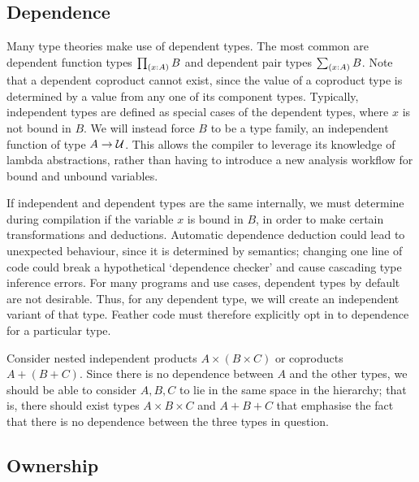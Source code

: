 \documentclass[UKenglish, 11pt, a4paper, parskip=half]{scrbook}
\begin{document}
\subsection{Dependence}

Many type theories make use of dependent types.
The most common are dependent function types \( \tprd{x:A} B \) and dependent pair types \( \tsm{x:A} B \).
Note that a dependent coproduct cannot exist, since the value of a coproduct type is determined by a value from any one of its component types.
Typically, independent types are defined as special cases of the dependent types, where \( x \) is not bound in \( B \).
We will instead force \( B \) to be a type family, an independent function of type \( A \to \mathcal{U} \).
This allows the compiler to leverage its knowledge of lambda abstractions, rather than having to introduce a new analysis workflow for bound and unbound variables.

If independent and dependent types are the same internally, we must determine during compilation if the variable \( x \) is bound in \( B \), in order to make certain transformations and deductions.
Automatic dependence deduction could lead to unexpected behaviour, since it is determined by semantics; changing one line of code could break a hypothetical `dependence checker' and cause cascading type inference errors.
For many programs and use cases, dependent types by default are not desirable.
Thus, for any dependent type, we will create an independent variant of that type.
Feather code must therefore explicitly opt in to dependence for a particular type.

Consider nested independent products \( A \times (B \times C) \) or coproducts \( A + (B + C) \).
Since there is no dependence between \( A \) and the other types, we should be able to consider \( A, B, C \) to lie in the same space in the hierarchy; that is, there should exist types \( A \times B \times C \) and \( A + B + C \) that emphasise the fact that there is no dependence between the three types in question.

\subsection{Ownership}
\end{document}
